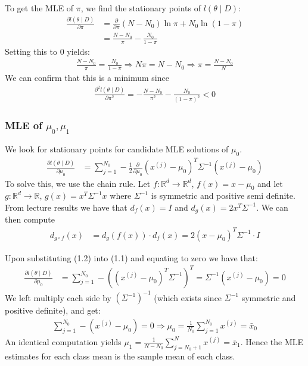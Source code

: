 \documentclass[paper=a4, fontsize=11pt]{scrartcl} %
\numberwithin{equation}{section} %
\numberwithin{figure}{section} %
\numberwithin{table}{section} %
\begin{document}
	To get the MLE of \(\pi\), we find the stationary points of \(l(\theta \mid D)\):
	\begin{align*}
	\frac{\partial l(\theta \mid D)}{\partial \pi} &= \frac{\partial}{\partial \pi} (N-N_0)\ln \pi + N_0\ln(1-\pi) \\
	&=  \frac{N-N_0}{\pi} - \frac{N_0}{1 - \pi}
	\end{align*}
	Setting this to \(0\) yields:
	\begin{align*}
	\frac{N-N_0}{\pi} = \frac{N_0}{1 - \pi} \Rightarrow N\pi = N - N_0 \Rightarrow \pi = \frac{N-N_0}{N}
	\end{align*}
	We can confirm that this is a minimum since
	\begin{align*}
	\frac{\partial^2 l(\theta \mid D)}{\partial \pi^2} = -\frac{N-N_0}{\pi^2}-\frac{N_0}{(1-\pi)^2} < 0
	\end{align*}

\subsubsection{MLE of \(\mu_0, \mu_1\)}

	We look for stationary points for candidate MLE solutions of \(\mu_0\).
	\begin{align}
	\frac{\partial l(\theta \mid D)}{\partial \mu_0} &= \sum_{j=1}^{N_0} -\frac{1}{2} \frac{\partial}{\partial \mu_0} (x^{(j)}-\mu_0)^T\Sigma^{-1}(x^{(j)}-\mu_0)
	\end{align}
	To solve this, we use the chain rule. Let \(f: \mathbb{R}^d \rightarrow \mathbb{R}^d\), \(f(x) = x-\mu_0\) and let \(g: \mathbb{R}^d \rightarrow \mathbb{R}\), \(g(x) = x^T\Sigma^{-1}x\) where \(\Sigma^{-1}\) is symmetric and positive semi definite.
	From lecture results we have that \(d_f(x) = I\) and \(d_g(x) = 2x^T\Sigma^{-1}\). We can then compute 
	\begin{align}
	d_{g \circ f}(x) &= d_{g} (f(x)) \cdot d_{f} (x) = 2(x-\mu_0)^T\Sigma^{-1}\cdot I
	\end{align}
	
	Upon substituting (1.2) into (1.1) and equating to zero we have that:
	\begin{align}
	\frac{\partial l(\theta \mid D)}{\partial \mu_0} &= \sum_{j=1}^{N_0} -((x^{(j)}-\mu_0)^T\Sigma^{-1})^T = \Sigma^{-1}(x^{(j)}-\mu_0)= 0
	\end{align}
	We left multiply each side by \((\Sigma^{-1})^{-1}\) (which exists since \(\Sigma^{-1}\) symmetric and positive definite), and get:
	\begin{align}
	\sum_{j=1}^{N_0} -(x^{(j)}-\mu_0) = 0 \Rightarrow \mu_0 = \frac{1}{N_0}\sum_{j=1}^{N_0} x^{(j)} = \bar{x}_0
	\end{align}
	An identical computation yields \(\mu_1 = \frac{1}{N - N_0}\sum_{j=N_0+1}^{N} x^{(j)} = \bar{x}_1\). Hence the MLE estimates for each class mean is the sample mean of each class.
	
\end{document}
